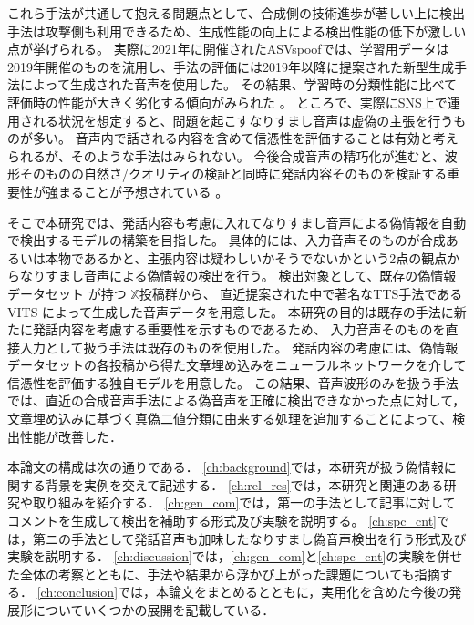 これら手法が共通して抱える問題点として、合成側の技術進歩が著しい上に検出手法は攻撃側も利用できるため、生成性能の向上による検出性能の低下が激しい点が挙げられる。
実際に2021年に開催されたASVspoofでは、学習用データは2019年開催のものを流用し、手法の評価には2019年以降に提案された新型生成手法によって生成された音声を使用した。
その結果、学習時の分類性能に比べて評価時の性能が大きく劣化する傾向がみられた \cite{yamagishi21_asvspoof,yu_icmece}。
ところで、実際にSNS上で運用される状況を想定すると、問題を起こすなりすまし音声は虚偽の主張を行うものが多い。
音声内で話される内容を含めて信憑性を評価することは有効と考えられるが、そのような手法はみられない。
今後合成音声の精巧化が進むと、波形そのものの自然さ/クオリティの検証と同時に発話内容そのものを検証する重要性が強まることが予想されている \cite{10208955}。

そこで本研究では、発話内容も考慮に入れてなりすまし音声による偽情報を自動で検出するモデルの構築を目指した。
具体的には、入力音声そのものが合成あるいは本物であるかと、主張内容は疑わしいかそうでないかという2点の観点からなりすまし音声による偽情報の検出を行う。
検出対象として、既存の偽情報データセット \cite{10.1145/3477495.3531744}が持つ $\mathbb{X}$投稿群から、
直近提案された中で著名なTTS手法であるVITS \cite{pmlr-v139-kim21f}によって生成した音声データを用意した。
本研究の目的は既存の手法に新たに発話内容を考慮する重要性を示すものであるため、
入力音声そのものを直接入力として扱う手法は既存のものを使用した。
発話内容の考慮には、偽情報データセットの各投稿から得た文章埋め込みをニューラルネットワークを介して信憑性を評価する独自モデルを用意した。
この結果、音声波形のみを扱う手法では、直近の合成音声手法による偽音声を正確に検出できなかった点に対して，
文章埋め込みに基づく真偽二値分類に由来する処理を追加することによって、検出性能が改善した．


本論文の構成は次の通りである．
\cref{ch:background}では，本研究が扱う偽情報に関する背景を実例を交えて記述する．
\cref{ch:rel_res}では，本研究と関連のある研究や取り組みを紹介する．
\cref{ch:gen_com}では，第一の手法として記事に対してコメントを生成して検出を補助する形式及び実験を説明する。
\cref{ch:spc_cnt}では，第ニの手法として発話音声も加味したなりすまし偽音声検出を行う形式及び実験を説明する．
\cref{ch:discussion}では，\cref{ch:gen_com}と\cref{ch:spc_cnt}の実験を併せた全体の考察とともに、手法や結果から浮かび上がった課題についても指摘する．
\cref{ch:conclusion}では，本論文をまとめるとともに，実用化を含めた今後の発展形についていくつかの展開を記載している．